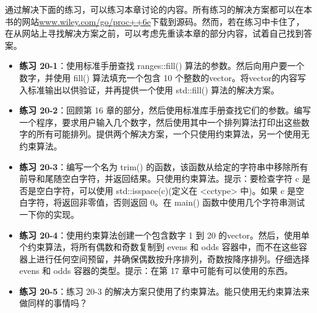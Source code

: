 通过解决下面的练习，可以练习本章讨论的内容。所有练习的解决方案都可以在本书的网站\url{www.wiley.com/go/proc++6e}下载到源码。然而，若在练习中卡住了，在从网站上寻找解决方案之前，可以考虑先重读本章的部分内容，试着自己找到答案。

\begin{itemize}
\item
\textbf{练习 20-1}：使用标准手册查找 ranges::fill() 算法的参数。然后向用户要一个数字，并使用 fill() 算法填充一个包含 10 个整数的vector。将vector的内容写入标准输出以供验证，并再提供一个使用 std::fill() 算法的解决方案。

\item
\textbf{练习 20-2}：回顾第 16 章的部分，然后使用标准库手册查找它们的参数。编写一个程序，要求用户输入几个数字，然后使用其中一个排列算法打印出这些数字的所有可能排列。提供两个解决方案，一个只使用约束算法，另一个使用无约束算法。

\item
\textbf{练习 20-3}：编写一个名为 trim() 的函数，该函数从给定的字符串中移除所有前导和尾随空白字符，并返回结果。只使用约束算法。提示：要检查字符 c 是否是空白字符，可以使用 std::isspace(c)(定义在 <cctype> 中)。如果 c 是空白字符，将返回非零值，否则返回 0。在 main() 函数中使用几个字符串测试一下你的实现。

\item
\textbf{练习 20-4}：使用约束算法创建一个包含数字 1 到 20 的vector。然后，使用单个约束算法，将所有偶数和奇数复制到 evens 和 odds 容器中，而不在这些容器上进行任何空间预留，并确保偶数按升序排列，奇数按降序排列。仔细选择 evens 和 odds 容器的类型。提示：在第 17 章中可能有可以使用的东西。

\item
\textbf{练习 20-5}：练习 20-3 的解决方案只使用了约束算法。能只使用无约束算法来做同样的事情吗？
\end{itemize}












